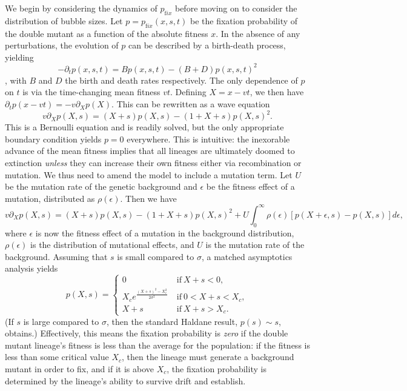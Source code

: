 \documentclass[rmp]{revtex4}
\begin{document}
We begin by considering the dynamics of $p_{\mathrm fix}$ before moving on to consider the distribution of bubble sizes.
Let $p = p_{\mathrm fix}(x,s,t)$ be the fixation probability of the double mutant as a function of the absolute fitness $x$.
In the absence of any perturbations, the evolution of $p$ can be described by a birth-death process, yielding
\begin{equation}
-\partial_t p(x,s,t) = Bp(x,s,t) - (B+D)p(x,s,t)^2
\end{equation}
\citep{barton_1995, good_2012}, with $B$ and $D$ the birth and death rates respectively.
The only dependence of $p$ on $t$ is via the time-changing mean fitness $vt$.
Defining $X = x - vt$, we then have $\partial_t p(x-vt) = -v\partial_X p(X)$.
This can be rewritten as a wave equation
\begin{equation}
v \partial_X p(X,s) = (X+s)p(X,s) - (1+X+s)p(X,s)^2.
\end{equation}
This is a Bernoulli equation and is readily solved, but the only appropriate boundary condition yields $p = 0$ everywhere.
This is intuitive: the inexorable advance of the mean fitness implies that all lineages are ultimately doomed to extinction \emph{unless} they can increase their own fitness either via recombination or mutation.
We thus need to amend the model to include a mutation term.
Let $U$ be the mutation rate of the genetic background and $\epsilon$ be the fitness effect of a mutation, distributed as $\rho(\epsilon)$.
Then we have
\begin{equation}
v \partial_X p(X,s) = (X+s)p(X,s) - (1+X+s)p(X,s)^2 + U\int_0^\infty \rho(\epsilon) \left[ p(X+\epsilon,s)-p(X,s)\right] d\epsilon,
\end{equation}
where $\epsilon$ is now the fitness effect of a mutation in the background distribution, $\rho(\epsilon)$ is the distribution of mutational effects, and $U$ is the mutation rate of the background.
Assuming that $s$ is small compared to $\sigma$, a matched asymptotics analysis yields
\begin{equation}
p(X,s) =
\begin{cases}
0 &\mathrm{~if~} X+s < 0, \\
X_c e^{\frac{(X+s)^2-X_c^2}{2\sigma^2}} &\mathrm{~if~} 0 < X+s < X_c, \\
X+s &\mathrm{~if~} X+s > X_c.
\end{cases}
\end{equation}
(If $s$ is large compared to $\sigma$, then the standard Haldane result, $p(s) \sim s$, obtains.)
Effectively, this means the fixation probability is \emph{zero} if the double mutant lineage's fitness is less than the average for the population: if the fitness is less than some critical value $X_c$, then the lineage must generate a background mutant in order to fix, and if it is above $X_c$, the fixation probability is determined by the lineage's ability to survive drift and establish.
\end{document}
